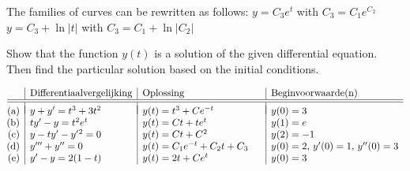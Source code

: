 \begin{Answer}\phantom{} The families of curves can be rewritten as follows:
	    \Question $y = C_3e^{t}$ with $C_3 = C_1e^{C_2}$
	    \Question $y = C_3 + \ln |t|$ with $C_3 = C_1+\ln |C_2|$
    \EndCurrentQuestion
\end{Answer}

\begin{Exercise} Show that the function $y(t)$ is a solution of the given differential equation. Then find the particular solution based on the initial conditions.
			\par
			\begin{flushright}
            \setlength{\arraycolsep}{0.28cm} 
            $\begin{array}{r|l|l|l}
            &\mbox{Differentiaalvergelijking} & \mbox{Oplossing} & \mbox{Beginvoorwaarde(n)}\\ 
            \hline
            \hline
            &&&\vspace{-0.3cm}\\
            \hspace{-0.2cm}\mbox{(a)} &  y + y' = t^3 + 3 t^2\quad\; & y(t) = t^3 + Ce^{-t} &  y(0)=3 \\
            \hspace{-0.2cm}\mbox{(b)} &  t y' - y = t^2 e^t & y(t) = Ct + t e^{t} &  y(1)=e \\
            \hspace{-0.2cm}\mbox{(c)} &  y - t y' - y'{^2} = 0 & y(t) = C t + C^2 &  y(2)=-1 \\
            \hspace{-0.2cm}\mbox{(d)} &  y''' + y'' = 0 & y(t) = C_1 e^{-t} + C_2 t + C_3\quad\; &  y(0)=2,\, y'(0)= 1,\, y''(0)= 3\\
            \hspace{-0.2cm}\mbox{(e)} &  y' - y = 2(1-t) & y(t) = 2t+Ce^t  &  y(0)=3 \\ %
            \end{array}$
            \end{flushright}
			\EndCurrentQuestion
\end{Exercise}

